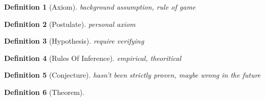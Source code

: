 \documentclass{article}
\newtheorem{definition}{Definition}
\begin{document}
\begin{definition}[Axiom]
    background assumption, rule of game
\end{definition}

\begin{definition}[Postulate]
    personal axiom
\end{definition}

\begin{definition}[Hypothesis]
    require verifying
\end{definition}

\begin{definition}[Rules Of Inference]
    empirical,
    theoritical
\end{definition}

\begin{definition}[Conjecture]
    hasn't been strictly proven, maybe wrong in the future
\end{definition}

\begin{definition}[Theorem]
\end{definition}
\end{document}
